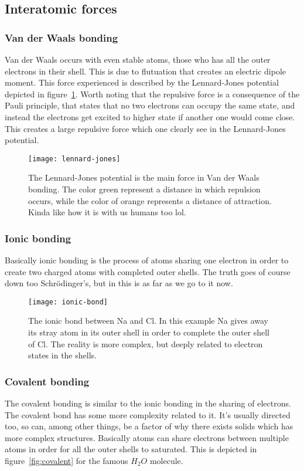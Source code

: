 \documentclass[11pt]{article}
\begin{document}
\newpage
\subsection{Interatomic forces}
\subsubsection{Van der Waals bonding}
Van der Waals occurs with even stable atoms, those who has all the outer electrons in their shell. This is due to flutuation that creates an electric dipole moment. This force experienced is described by the Lennard-Jones potential depicted in figure~\ref{fig:lennard-jones}. Worth noting that the repulsive force is a consequence of the Pauli principle, that states that no two electrons can occupy the same state, and instead the electrons get excited to higher state if another one would come close. This creates a large repulsive force which one clearly see in the Lennard-Jones potential.
\begin{figure}[!h]
	\centering
	\texttt{[image: lennard-jones]}
	\caption{The Lennard-Jones potential is the main force in Van der Waals bonding. The color green represent a distance in which repulsion occurs, while the color of orange represents a distance of attraction. Kinda like how it is with us humans too lol.}
	\label{fig:lennard-jones}
\end{figure}

\newpage
\subsubsection{Ionic bonding}
Basically ionic bonding is the process of atoms sharing one electron in order to create two charged atoms with completed outer shells. The truth goes of course down too Schrödinger's, but in this is as far as we go to it now.
\begin{figure}[!h]
	\centering
	\texttt{[image: ionic-bond]}
	\caption{The ionic bond between Na and Cl. In this example Na gives away its stray atom in its outer shell in order to complete the outer shell of Cl. The reality is more complex, but deeply related to electron states in the shells.}
	\label{fig:ionic-bond}
\end{figure}

\newpage
\subsubsection{Covalent bonding}
The covalent bonding is similar to the ionic bonding in the sharing of electrons. The covalent bond has some more complexity related to it. It's usually directed too, so can, among other things, be a factor of why there exists solids which has more complex structures. Basically atoms can share electrons between multiple atoms in order for all the outer shells to saturated. This is depicted in figure~\ref{fig:covalent} for the famous $H_2O$ molecule.
\end{document}
